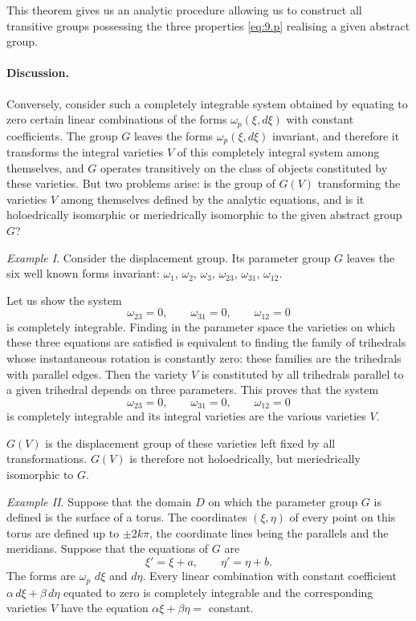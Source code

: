 \somespace

This theorem gives us an analytic procedure allowing us to construct all transitive groups possessing the three properties \eqref{eq:9.p} realising a given abstract group.

\paragraph{Discussion.}
\label{sec:117}
Conversely, consider such a completely integrable system obtained by equating to zero certain linear combinations of the forms $\omega_{p}(\xi,d\xi)$ with constant coefficients. The group $G$ leaves the forms $\omega_{p}(\xi,d\xi)$ invariant, and therefore it transforms the integral varieties $V$ of this completely integral system among themselves, and $G$ operates transitively on the class of objects constituted by these varieties. But two problems arise: is the group of $G(V)$ transforming the varieties $V$ among themselves defined by the analytic equations, and is it holoedrically isomorphic or meriedrically isomorphic to the given abstract group $G$?

\somespace

\emph{Example I}. Consider the displacement group. Its parameter group $G$ leaves the six well known forms invariant: $\omega_{1}$, $\omega_{2}$, $\omega_{3}$, $\omega_{23}$, $\omega_{31}$, $\omega_{12}$.

Let us show the system
\[
\omega_{23}=0,\qquad\omega_{31}=0,\qquad\omega_{12}=0
\]
is completely integrable. Finding in the parameter space the varieties on which these three equations are satisfied is equivalent to finding the family of trihedrals whose instantaneous rotation is constantly zero: these families are the trihedrals  with parallel edges. Then the variety $V$ is constituted by all trihedrals parallel to a given trihedral depends on three parameters. This proves that the system
\[
\omega_{23}=0,\qquad\omega_{31}=0,\qquad\omega_{12}=0
\]
is completely integrable and its integral varieties are the various varieties $V$.

$G(V)$ is the displacement group of these varieties left fixed by all transformations. $G(V)$ is therefore not holoedrically, but meriedrically isomorphic to $G$.

\somespace

\emph{Example II}. Suppose that the domain $D$ on which the parameter group $G$ is defined is the surface of a torus. The coordinates $(\xi,\eta)$ of every point on this torus are defined up to $\pm 2k\pi$, the coordinate lines being the parallels and the meridians. Suppose that the equations of $G$ are
\[
\xi'=\xi+a,\qquad\eta'=\eta+b.
\]
The forms are $\omega_{p}$ $d\xi$ and $d\eta$. Every linear combination with constant coefficient $\alpha\,d\xi+\beta\,d\eta$ equated to zero is completely integrable and the corresponding varieties $V$ have the equation $\alpha\xi+\beta\eta=$ constant.

